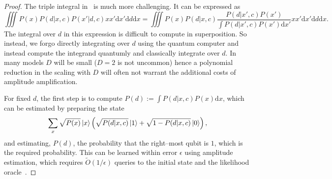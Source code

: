 \documentclass[aps,amsmath,onecolumn,amssymb]{revtex4}
\begin{document}
\begin{proof}
The triple integral in~ is much more challenging.  It can be expressed as
\begin{equation}
\iiint P(x) P(d|x,c) P(x'|d,c) xx' \mathrm{d}x' \mathrm{d}d\mathrm{d}x\nonumber = \iiint P(x) P(d|x,c) \frac{P(d|x',c)P(x')}{\int P(d|x',c) P(x')\mathrm{d}x'} xx' \mathrm{d}x' \mathrm{d}d\mathrm{d}x.
\end{equation}
The integral over $d$ in this expression is difficult to compute in superposition.  So instead, we forgo directly integrating over $d$ using the quantum computer and instead compute the integrand quantumly and classically integrate over $d$.  In many models $D$ will be small ($D=2$ is not uncommon) hence a polynomial reduction in the scaling with $D$ will often not warrant the additional costs of amplitude amplification.

For fixed $d$, the first step is to compute $P(d):=\int P(d|x,c) P(x)\mathrm{d}x$, which can be estimated by preparing the state
\begin{equation}
\sum_x \sqrt{P(x)} \left|x\right\rangle \left(\sqrt{{P(d|x,c)}}\left|1\right\rangle + \sqrt{1 -P(d|x,c)}\left|0\right\rangle \right),\label{eq:update1}
\end{equation}
and estimating, $P(d)$, the probability that the right--most qubit is $1$, which is the required probability.   This can be learned within error $\epsilon$ using amplitude estimation, which requires $\tilde{O}(1/\epsilon)$ queries to the initial state and the likelihood oracle~\cite{BHT+00}.



\end{proof}
\end{document}
